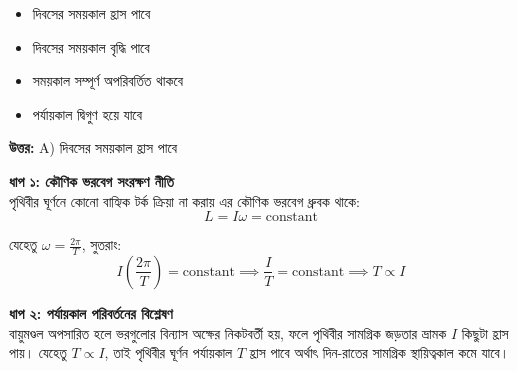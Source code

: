 \documentclass[12pt, a4paper]{article}
\begin{document}
{{\begin{center}
\end{center}
\vspace{1em}

\begin{itemize}[label={}, leftmargin=1cm, itemsep=0.5em]
    \item[\textbf{A)}] দিবসের সময়কাল হ্রাস পাবে
    \item[\textbf{B)}] দিবসের সময়কাল বৃদ্ধি পাবে
    \item[\textbf{C)}] সময়কাল সম্পূর্ণ অপরিবর্তিত থাকবে
    \item[\textbf{D)}] পর্যায়কাল দ্বিগুণ হয়ে যাবে
\end{itemize}

\vspace{0.5em}
\begin{tcolorbox}[answerbox]
    \textbf{\color{success} উত্তর:} A) দিবসের সময়কাল হ্রাস পাবে
\end{tcolorbox}
\vspace{1em}

\begin{tcolorbox}[solutionbox={সমাধান (Solution)}]
    \noindent
    \textbf{ধাপ ১: কৌণিক ভরবেগ সংরক্ষণ নীতি} \\
    পৃথিবীর ঘূর্ণনে কোনো বাহ্যিক টর্ক ক্রিয়া না করায় এর কৌণিক ভরবেগ ধ্রুবক থাকে:
    \[ L = I \omega = \text{constant} \]
    
    যেহেতু $\omega = \frac{2\pi}{T}$, সুতরাং:
    \[ I \left(\frac{2\pi}{T}\right) = \text{constant} \implies \frac{I}{T} = \text{constant} \implies T \propto I \]
    
    \vspace{0.5em}
    \noindent\textbf{ধাপ ২: পর্যায়কাল পরিবর্তনের বিশ্লেষণ} \\
    বায়ুমণ্ডল অপসারিত হলে ভরগুলোর বিন্যাস অক্ষের নিকটবর্তী হয়, ফলে পৃথিবীর সামগ্রিক জড়তার ভ্রামক $I$ কিছুটা হ্রাস পায়। 
    যেহেতু $T \propto I$, তাই পৃথিবীর ঘূর্ণন পর্যায়কাল $T$ হ্রাস পাবে অর্থাৎ দিন-রাতের সামগ্রিক স্থায়িত্বকাল কমে যাবে।
\end{tcolorbox}
\newpage

}}
\end{document}
